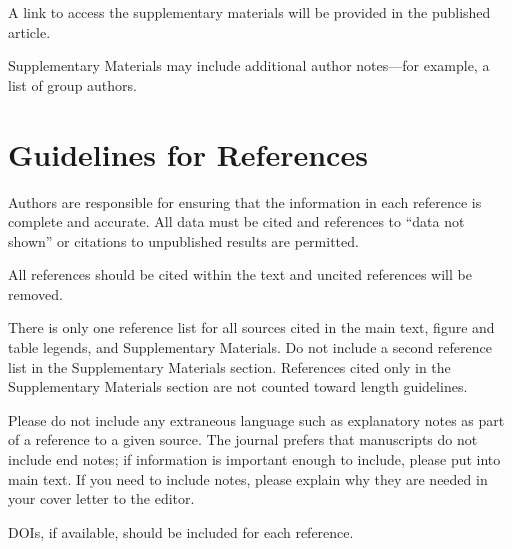 \documentclass{article}
\begin{document}
A link to access the supplementary materials will be provided in the published article.

Supplementary Materials may include additional author notes—for example, a list of group authors.

\section*{Guidelines for References}
Authors are responsible for ensuring that the information in each reference is complete and accurate. All data must be cited and references to ``data not shown'' or citations to unpublished results are permitted.

All references should be cited within the text and uncited references will be removed.

There is only one reference list for all sources cited in the main text, figure and table legends, and Supplementary Materials. Do not include a second reference list in the Supplementary Materials section. References cited only in the Supplementary Materials section are not counted toward length guidelines.

Please do not include any extraneous language such as explanatory notes as part of a reference to a given source. The journal prefers that manuscripts do not include end notes; if information is important enough to include, please put into main text.  If you need to include notes, please explain why they are needed in your cover letter to the editor.

DOIs, if available, should be included for each reference.



\end{document}
